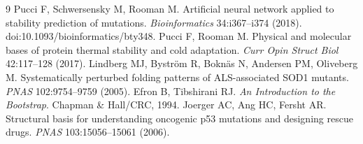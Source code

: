 \documentclass[11pt]{article}
\begin{document}
\begin{thebibliography}{9}
 Pucci F, Schwersensky M, Rooman M.
Artificial neural network applied to stability prediction of mutations.
\textit{Bioinformatics} 34:i367--i374 (2018). doi:10.1093/bioinformatics/bty348.
 Pucci F, Rooman M.
Physical and molecular bases of protein thermal stability and cold adaptation.
\textit{Curr Opin Struct Biol} 42:117--128 (2017).
 Lindberg MJ, Bystr\"om R,
Bokn\"as N, Andersen PM, Oliveberg M. Systematically perturbed folding
patterns of ALS-associated SOD1 mutants. \textit{PNAS} 102:9754--9759 (2005).
 Efron B, Tibshirani RJ.
\emph{An Introduction to the Bootstrap}. Chapman \& Hall/CRC, 1994.
 Joerger AC, Ang HC, Fersht AR.
Structural basis for understanding oncogenic p53 mutations and designing
rescue drugs. \textit{PNAS} 103:15056--15061 (2006).
\end{thebibliography}
\end{document}
